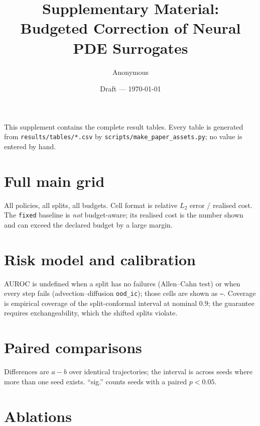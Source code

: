 \documentclass[11pt]{article}
\title{Supplementary Material:\\Budgeted Correction of Neural PDE Surrogates}
\author{Anonymous}
\date{Draft --- \today}
\begin{document}
\maketitle

This supplement contains the complete result tables. Every table is generated
from \texttt{results/tables/*.csv} by
\texttt{scripts/make\_paper\_assets.py}; no value is entered by hand.

\section{Full main grid}

All policies, all splits, all budgets. Cell format is relative $L_2$ error /
realised cost. The \texttt{fixed} baseline is \emph{not} budget-aware; its
realised cost is the number shown and can exceed the declared budget by a large
margin.

{\footnotesize
\setlength{\tabcolsep}{3pt}
}

\section{Risk model and calibration}

AUROC is undefined when a split has no failures (Allen--Cahn test) or when every
step fails (advection--diffusion \texttt{ood\_ic}); those cells are shown
as \texttt{--}. Coverage is empirical coverage of the split-conformal interval
at nominal $0.9$; the guarantee requires exchangeability, which the shifted
splits violate.

\begin{center}
\footnotesize

\end{center}

\section{Paired comparisons}

Differences are $a-b$ over identical trajectories; the interval is across
seeds where more than one seed exists. ``sig.'' counts seeds with a paired
$p<0.05$.

\begin{center}
\scriptsize
\setlength{\tabcolsep}{2pt}

\end{center}

\section{Ablations}
\end{document}
